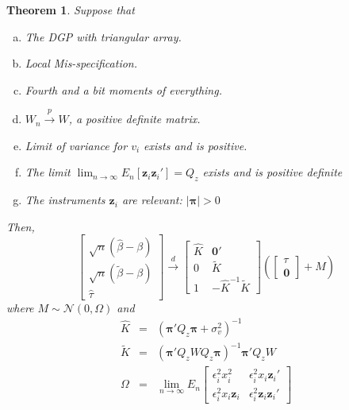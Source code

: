 \documentclass[12pt]{article}\usepackage[]{graphicx}\usepackage[]{color}
\newtheorem{thm}{Theorem}[section]
\theoremstyle{definition}
\begin{document}
\begin{thm}
\label{thm:OLSIV}
Suppose that
  \begin{enumerate}[(a)]
    \item The DGP with triangular array.
    \item Local Mis-specification.
    \item Fourth and a bit moments of everything.
    \item $W_n \overset{p}{\rightarrow} W$, a positive definite matrix.
    \item Limit of variance for $v_i$ exists and is positive.
    \item The limit $\lim_{n\rightarrow \infty} E_n[\mathbf{z}_i \mathbf{z}_i'] = Q_z$ exists and is positive definite
    \item The instruments $\mathbf{z}_i$ are relevant:  $|\boldsymbol{\pi}|>0$
  \end{enumerate}
  Then,
  $$
\left[
\begin{array}{c}
  \sqrt{n}\left(\widehat{\beta} - \beta\right) \\
  \sqrt{n}\left(\widetilde{\beta} - \beta\right)\\
  \widehat{\tau}
\end{array}
\right] \overset{d}{\rightarrow} 
\left[\begin{array}{cc}
\widehat{K} & \mathbf{0}'\\
  0 & \widetilde{K}\\
  1 & -\widehat{K}^{-1} \widetilde{K}
  \end{array}
  \right]\left( \left[\begin{array}{c} \tau \\ \mathbf{0}  \end{array} \right] + M\right)
$$
where $M \sim \mathcal{N}(0, \Omega)$ and
  \begin{eqnarray}
 \widehat{K}&=&   \left(\boldsymbol{\pi}'Q_z \boldsymbol{\pi} + \sigma_v^2\right)^{-1}\\
    \widetilde{K}&=& \left(\boldsymbol{\pi}'Q_z W Q_z \boldsymbol{\pi} \right)^{-1}\boldsymbol{\pi}'Q_z W\\
    \Omega &=& \lim_{n\rightarrow \infty} E_n \left[
    \begin{array}{cc}
      \epsilon_i^2 x_i^2 & \epsilon_i^2 x_i \mathbf{z}_i' \\
      \epsilon_i^2 x_i \mathbf{z}_i& \epsilon_i^2 \mathbf{z}_i \mathbf{z}_i'
    \end{array}
    \right]
  \end{eqnarray}
\end{thm}
\end{document}
